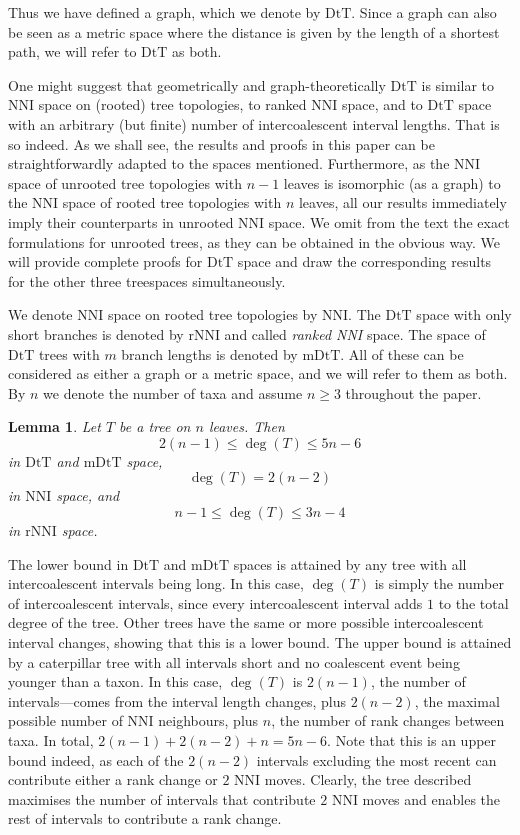 \documentclass{amsart}
\newtheorem{lemma}{Lemma}
\newcommand{\dts}{\mathrm{DtT}}
\newcommand{\nni}{\mathrm{NNI}}
\newcommand{\rnni}{\mathrm{rNNI}}
\newcommand{\mdts}{\mathrm{mDtT}}
\begin{document}
Thus we have defined a graph, which we denote by $\dts$.
Since a graph can also be seen as a metric space where the distance is given by the length of a shortest path, we will refer to $\dts$ as both.

One might suggest that geometrically and graph-theoretically $\dts$ is similar to NNI space on (rooted) tree topologies, to ranked NNI space, and to $\dts$ space with an arbitrary (but finite) number of intercoalescent interval lengths.
That is so indeed.
As we shall see, the results and proofs in this paper can be straightforwardly adapted to the spaces mentioned.
Furthermore, as the NNI space of unrooted tree topologies with $n-1$ leaves is isomorphic (as a graph) to the NNI space of rooted tree topologies with $n$ leaves, all our results immediately imply their counterparts in unrooted NNI space.
We omit from the text the exact formulations for unrooted trees, as they can be obtained in the obvious way.
We will provide complete proofs for $\dts$ space and draw the corresponding results for the other three treespaces simultaneously.

We denote NNI space on rooted tree topologies by $\nni$.
The $\dts$ space with only short branches is denoted by $\rnni$ and called {\em ranked NNI} space.
The space of $\dts$ trees with $m$ branch lengths is denoted by $\mdts$.
All of these can be considered as either a graph or a metric space, and we will refer to them as both.
By $n$ we denote the number of taxa and assume $n \geq 3$ throughout the paper.

\begin{lemma}\label{neighBound}
Let $T$ be a tree on $n$ leaves. 
Then
\[2(n-1) \leq \deg(T) \leq 5n-6\] in $\dts$ and $\mdts$ space,
\[\deg(T) = 2(n-2)\] in $\nni$ space, and
\[n-1\leq \deg(T) \leq3n-4\] in $\rnni$ space.
\end{lemma}

\proof
The lower bound in $\dts$ and $\mdts$ spaces is attained by any tree with all intercoalescent intervals being long.
In this case, $\deg(T)$ is simply the number of intercoalescent intervals, since every intercoalescent interval adds $1$ to the total degree of the tree.
Other trees have the same or more possible intercoalescent interval changes, showing that this is a lower bound.
The upper bound is attained by a caterpillar tree with all intervals short and no coalescent event being younger than a taxon.
In this case, $\deg(T)$ is $2(n-1)$, the number of intervals---comes from the interval length changes, plus $2(n-2)$, the maximal possible number of NNI neighbours, plus $n$, the number of rank changes between taxa.
In total, $2(n-1) + 2(n-2) + n = 5n-6$.
Note that this is an upper bound indeed, as each of the $2(n-2)$ intervals excluding the most recent can contribute either a rank change or $2$ NNI moves.
Clearly, the tree described maximises the number of intervals that contribute $2$ NNI moves and enables the rest of intervals to contribute a rank change.
\end{document}

